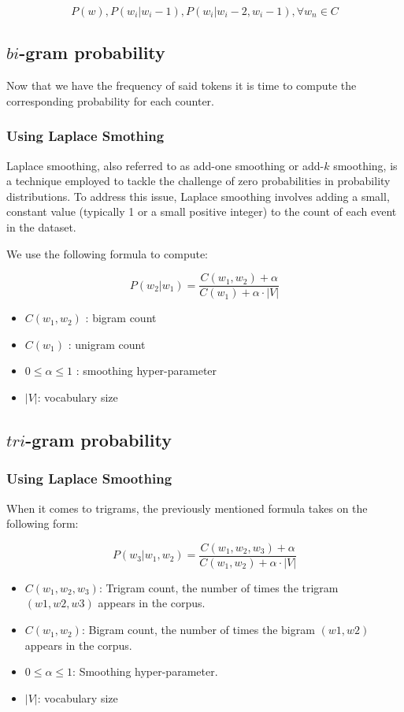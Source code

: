 \documentclass[11pt,onside]{article}
\begin{document}
\begin{enumerate}
\[P(w), P(w_i | w_i-1), P(w_i | w_i-2, w_i-1), \forall w_n \in C\]

\subsection*{\(bi\)-gram probability}
Now that we have the frequency of said tokens it is time to compute the corresponding probability for each counter.
\subsubsection*{Using Laplace Smothing}

Laplace smoothing, also referred to as add-one smoothing or add-$k$ smoothing, is a technique employed to tackle the challenge of zero probabilities in probability distributions. To address this issue, Laplace smoothing involves adding a small, constant value (typically 1 or a small positive integer) to the count of each event in the dataset. 

We use the following formula to compute:

\[P(w_2|w_1) = \frac{C(w_1,w_2) + \alpha}{C(w_1) + \alpha \cdot|V|}\]
\begin{itemize}
    \item \(C(w_1,w_2) \) : bigram count
    \item \(C(w_1)\)  : unigram count
    \item $ 0 \leq\alpha \leq1 $ :  smoothing hyper-parameter
    \item \(|V|\): vocabulary size
\end{itemize}

\subsection*{\(tri\)-gram probability}

\subsubsection*{Using Laplace Smoothing}
When it comes to trigrams, the previously mentioned formula takes on the following form:

$$ P(w_3|w_1,w_2) = \frac{C(w_1,w_2,w_3) + \alpha}{C(w_1,w_2) + \alpha \cdot|V|} $$
\begin{itemize}
    \item $ C(w_1, w_2, w_3) $: Trigram count, the number of times the trigram $(w1, w2, w3)$ appears in the corpus.
    \item $ C(w_1, w_2) $: Bigram count, the number of times the bigram \( (w1, w2)\) appears in the corpus.
    \item $ 0 \leq \alpha \leq 1 $:  Smoothing hyper-parameter.
    \item \(|V|\): vocabulary size
\end{itemize}


\end{enumerate}
\end{document}
